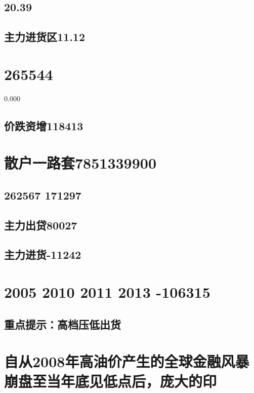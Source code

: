 \documentclass{article}
\begin{document}
\subsection{20.39}

\subsection{主力进货区11.12}

\section{265544}

0.000

\subsection{价跌资增118413}

\section{散户一路套7851339900}

\subsection{262567 171297}

\subsection{主力出贷80027}

\subsection{主力进货-11242}

\section{2005 2010 2011 2013 -106315}

\subsection{重点提示：高档压低出货}

\section{自从2008年高油价产生的全球金融风暴崩盘至当年底见低点后，庞大的印}
\end{document}
